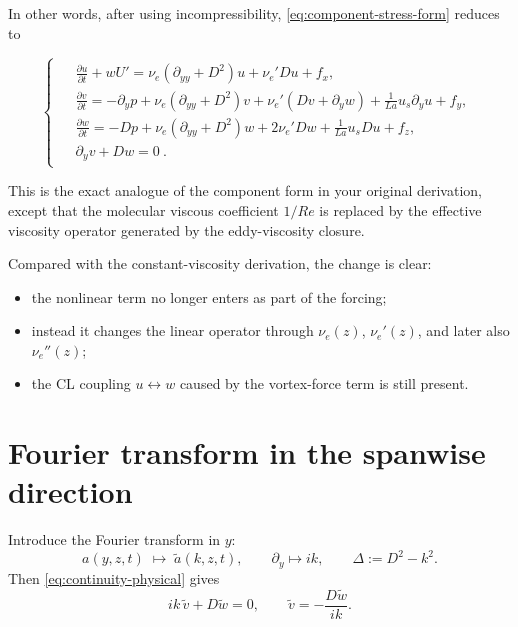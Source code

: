 \documentclass[11pt]{article}
\begin{document}
In other words, after using incompressibility, \eqref{eq:component-stress-form} reduces to
\begin{linenomath*}
\begin{equation}
\begin{cases}
\begin{aligned}
&\frac{\partial u}{\partial t}+wU'
=
\nu_e\left(\partial_{yy}+D^2\right)u
+\nu_e' D u
+f_x,
\\[3pt]
&\frac{\partial v}{\partial t}
=
-\partial_y p
+\nu_e\left(\partial_{yy}+D^2\right)v
+\nu_e'\left(Dv+\partial_y w\right)
+\frac{1}{La}u_s\partial_y u
+f_y,
\\[3pt]
&\frac{\partial w}{\partial t}
=
-Dp
+\nu_e\left(\partial_{yy}+D^2\right)w
+2\nu_e'Dw
+\frac{1}{La}u_sDu
+f_z,
\\[3pt]
&\partial_y v + Dw = 0
\ .
\end{aligned}
\end{cases}
\label{eq:component-simplified-form}
\end{equation}
\end{linenomath*}

This is the exact analogue of the component form in your original derivation, except that the molecular viscous coefficient \(1/Re\) is replaced by the effective viscosity operator generated by the eddy-viscosity closure.

Compared with the constant-viscosity derivation, the change is clear:
\begin{itemize}
\item the nonlinear term no longer enters as part of the forcing;
\item instead it changes the linear operator through \(\nu_e(z)\), \(\nu_e'(z)\), and later also \(\nu_e''(z)\);
\item the CL coupling \(u \leftrightarrow w\) caused by the vortex-force term is still present.
\end{itemize}

\section{Fourier transform in the spanwise direction}

Introduce the Fourier transform in \(y\):
\[
a(y,z,t)
\; \mapsto \;
\tilde a(k,z,t),
\qquad
\partial_y \mapsto ik,
\qquad
\Delta := D^2-k^2.
\]
Then \eqref{eq:continuity-physical} gives
\begin{equation}
ik\,\tilde v + D\tilde w = 0,
\qquad
\tilde v = -\frac{D\tilde w}{ik}.
\label{eq:continuity-fourier}
\end{equation}
\end{document}
